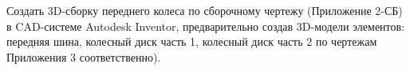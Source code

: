 
Создать 3D-сборку переднего колеса по сборочному чертежу (Приложение 2-СБ) в CAD-системе Autodesk Inventor, 
предварительно создав 3D-модели элементов: передняя шина, колесный диск часть 1, колесный диск часть 2 
по чертежам Приложения 3 соответственно).